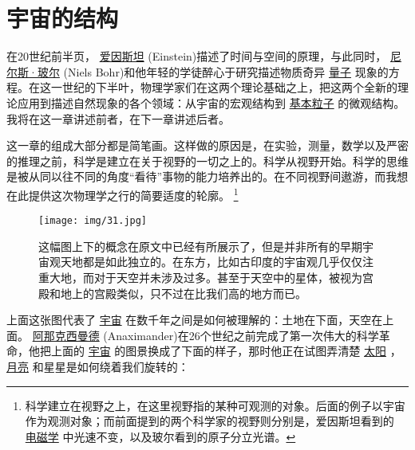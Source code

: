 	\chapter{宇宙的结构}
\indent

    在20世纪前半页，
\href{http://toyhouse.cc/wiki/index.php/爱因斯坦}{爱因斯坦}
(Einstein)描述了时间与空间的原理，与此同时，
\href{http://toyhouse.cc/wiki/index.php/尼尔斯·玻尔}{尼尔斯·玻尔}
(Niels Bohr)和他年轻的学徒醉心于研究描述物质奇异
\href{http://toyhouse.cc/wiki/index.php/量子}{量子}
现象的方程。在这一世纪的下半叶，物理学家们在这两个理论基础之上，把这两个全新的理论应用到描述自然现象的各个领域：从宇宙的宏观结构到
\href{http://toyhouse.cc/wiki/index.php/基本粒子}{基本粒子}
的微观结构。我将在这一章讲述前者，在下一章讲述后者。


    这一章的组成大部分都是简笔画。这样做的原因是，在实验，测量，数学以及严密的推理之前，科学是建立在关于视野的一切之上的。科学从视野开始。科学的思维是被从同以往不同的角度“看待”事物的能力培养出的。在不同视野间遨游，而我想在此提供这次物理学之行的简要适度的轮廓。
\footnote[1]
{
科学建立在视野之上，在这里视野指的某种可观测的对象。后面的例子以宇宙作为观测对象；而前面提到的两个科学家的视野则分别是，爱因斯坦看到的
\href{http://toyhouse.cc/wiki/index.php/电磁学}{电磁学}
中光速不变，以及玻尔看到的原子分立光谱。
}

\begin{figure}[htbp]
\begin{minipage}[t]{0.3\linewidth}
\centering
\bc
\texttt{[image: img/31.jpg]}\\[12pt]
\ec
\caption{这幅图上下的概念在原文中已经有所展示了，但是并非所有的早期宇宙观天地都是如此独立的。在东方，比如古印度的宇宙观几乎仅仅注重大地，而对于天空并未涉及过多。甚至于天空中的星体，被视为宫殿和地上的宫殿类似，只不过在比我们高的地方而已。}
\label{fig:side:a}
\end{minipage}

\end{figure}                  

    上面这张图代表了
\href{http://toyhouse.cc/wiki/index.php/宇宙}{宇宙}
在数千年之间是如何被理解的：土地在下面，天空在上面。
\href{http://toyhouse.cc/wiki/index.php/阿那克西曼德}{阿那克西曼德}
(Anaximander)在26个世纪之前完成了第一次伟大的科学革命，他把上面的
\href{http://toyhouse.cc/wiki/index.php/宇宙}{宇宙}
的图景换成了下面的样子，那时他正在试图弄清楚
\href{http://toyhouse.cc/wiki/index.php/太阳}{太阳}
，
\href{http://toyhouse.cc/wiki/index.php/月亮}{月亮}
和星星是如何绕着我们旋转的：

